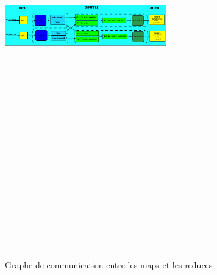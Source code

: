 \documentclass{article}
\begin{document}
    \begin{figure}[!h]
      \centering
	\includegraphics[angle=90, width=70mm, height=200mm]{img/diag.png}
	\caption{Graphe de communication entre les maps et les reduces}
    \end{figure}
\end{document}
